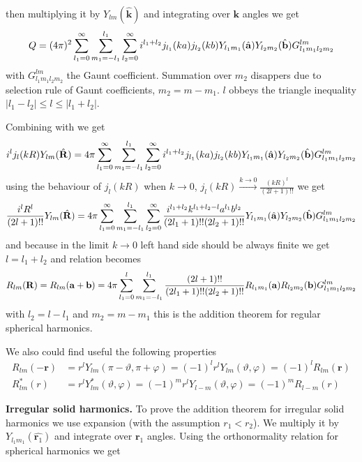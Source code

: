 then multiplying it by $Y_{lm}(\hat{\bm{k}})$
and integrating over $\bm{k}$ angles we get
\begin{equation}
\label{p2}
Q=(4\pi)^2
\sum_{l_1=0}^{\infty}\sum_{m_1=-l_1}^{l_1}\sum_{l_2=0}^{\infty}i^{l_1+l_2}j_{l_1}(ka)j_{l_2}(kb)Y_{l_1m_1}(\hat{\bf a})Y_{l_2m_2}(\hat{\bf b})G_{l_1m_1l_2m_2}^{lm}
\end{equation}
with $G_{l_1m_1l_2m_2}^{lm}$ the Gaunt coefficient. Summation over $m_2$
disappers due to selection rule of Gaunt coefficients, $m_2=m-m_1$. $l$
obbeys the triangle inequality $|l_1-l_2|\le l\le |l_1+l_2|$. 
\par{Combining  with  we get}
\begin{equation*}
i^lj_l(kR)Y_{lm}(\hat{\bf R})=4\pi\sum_{l_1=0}^{\infty}\sum_{m_1=-l_1}^{l_1}\sum_{l_2=0}^{\infty}i^{l_1+l_2}j_{l_1}(ka)j_{l_2}(kb)Y_{l_1m_1}(\hat{\bf a})Y_{l_2m_2}(\hat{\bf b})G_{l_1m_1l_2m_2}^{lm}
\end{equation*}
using the behaviour of $j_l(kR)$ when $k\rightarrow 0$,
$j_l(kR)\xrightarrow{k\rightarrow 0}\frac{(kR)^l}{(2l+1)!!}$ we get
\begin{equation*}
\frac{i^lR^{l}}{(2l+1)!!}Y_{lm}(\hat{\bf R})=4\pi\sum_{l_1=0}^{\infty}\sum_{m_1=-l_1}^{l_1}\sum_{l_2=0}^{\infty}\frac{i^{l_1+l_2}k^{l_1+l_2-l}a^{l_1}b^{l_2}}{(2l_1+1)!!(2l_2+1)!!}Y_{l_1m_1}(\hat{\bf a})Y_{l_2m_2}(\hat{\bf b})G_{l_1m_1l_2m_2}^{lm}
\end{equation*}
and because in the limit  $k\rightarrow 0$ left hand side should be always
finite we get $l=l_1+l_2$ and relation becomes
\begin{equation*}
R_{lm}({\bf R})=R_{lm}({\bf a}+{\bf b})=4\pi\sum_{l_1=0}^{l}\sum_{m_1=-l_1}^{l_1}\frac{(2l+1)!!}{(2l_1+1)!!(2l_2+1)!!}R_{l_1m_1}({\bf a})R_{l_2m_2}({\bf b})G_{l_1m_1l_2m_2}^{lm}    
\end{equation*}
with $l_2=l-l_1$ and $m_2=m-m_1$ this is the addition theorem for regular
spherical harmonics.
\par{We also could find useful the following properties}
\begin{equation}
\begin{split}
R_{lm}(-\bm{r})&=r^lY_{lm}(\pi
-\vartheta,\pi+\varphi)=(-1)^{l}r^lY_{lm}(\vartheta,\varphi)=(-1)^lR_{lm}(\bm{r})\\
R_{lm}^{*}(r)&=r^lY_{lm}^{*}(\vartheta,\varphi)=(-1)^mr^lY_{l-m}(\vartheta,\varphi)=(-1)^mR_{l-m}(r)
\end{split}
\end{equation}
\par{\textbf{Irregular solid harmonics.} To prove the addition theorem for irregular solid harmonics we use
  expansion (with the assumption $r_1<r_2$). We multiply it by
  $Y_{l_1m_1}(\hat{\bm{r}_1})$ and integrate over $\bm{r}_1$ angles. Using the
  orthonormality relation for spherical harmonics we get}
